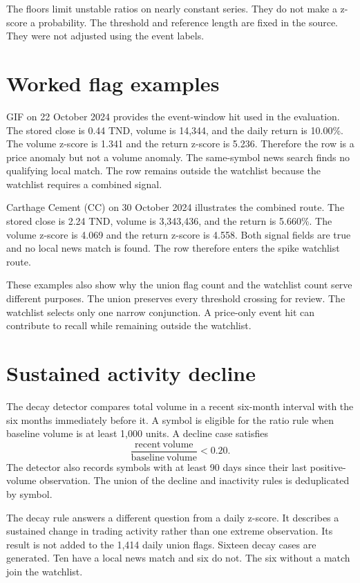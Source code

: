 The floors limit unstable ratios on nearly constant series. They do not make a
z-score a probability. The threshold and reference length are fixed in the
source. They were not adjusted using the event labels.

\section{Worked flag examples}

GIF on 22 October 2024 provides the event-window hit used in the evaluation.
The stored close is 0.44 TND, volume is 14,344, and the daily return is 10.00\%.
The volume z-score is 1.341 and the return z-score is 5.236. Therefore the row
is a price anomaly but not a volume anomaly. The same-symbol news search finds
no qualifying local match. The row remains outside the watchlist because the
watchlist requires a combined signal.

Carthage Cement (CC) on 30 October 2024 illustrates the combined route. The
stored close is 2.24 TND, volume is 3,343,436, and the return is 5.660\%. The
volume z-score is 4.069 and the return z-score is 4.558. Both signal fields are
true and no local news match is found. The row therefore enters the spike
watchlist route.

These examples also show why the union flag count and the watchlist count serve
different purposes. The union preserves every threshold crossing for review.
The watchlist selects only one narrow conjunction. A price-only event hit can
contribute to recall while remaining outside the watchlist.

\section{Sustained activity decline}

The decay detector compares total volume in a recent six-month interval with
the six months immediately before it. A symbol is eligible for the ratio rule
when baseline volume is at least 1,000 units. A decline case satisfies
\[
 \frac{\mathrm{recent\ volume}}{\mathrm{baseline\ volume}}<0.20.
\]
The detector also records symbols with at least 90 days since their last
positive-volume observation. The union of the decline and inactivity rules is
deduplicated by symbol.

The decay rule answers a different question from a daily z-score. It describes
a sustained change in trading activity rather than one extreme observation.
Its result is not added to the 1,414 daily union flags. Sixteen decay cases are
generated. Ten have a local news match and six do not. The six without a match
join the watchlist.

